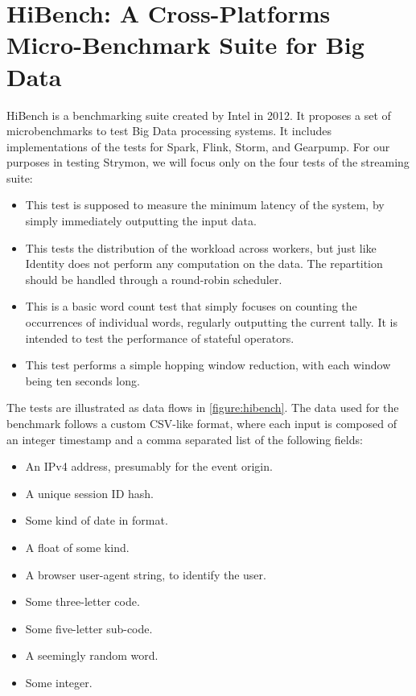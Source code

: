 \section{HiBench: A Cross-Platforms Micro-Benchmark Suite for Big Data\cite{hibench}}
HiBench is a benchmarking suite created by Intel in 2012. It proposes a set of microbenchmarks to test Big Data processing systems. It includes implementations of the tests for Spark, Flink, Storm, and Gearpump. For our purposes in testing Strymon, we will focus only on the four tests of the streaming suite:

\begin{itemize}
\item {} This test is supposed to measure the minimum latency of the system, by simply immediately outputting the input data.
\item {} This tests the distribution of the workload across workers, but just like Identity does not perform any computation on the data. The repartition should be handled through a round-robin scheduler.
\item {} This is a basic word count test that simply focuses on counting the occurrences of individual words, regularly outputting the current tally. It is intended to test the performance of stateful operators.
\item {} This test performs a simple hopping window reduction, with each window being ten seconds long.
\end{itemize}

The tests are illustrated as data flows in \autoref{figure:hibench}. The data used for the benchmark follows a custom CSV-like format, where each input is composed of an integer timestamp and a comma separated list of the following fields:

\begin{itemize}
\item {} An IPv4 address, presumably for the event origin.
\item {} A unique session ID hash.
\item {} Some kind of date in  format.
\item {} A float of some kind.
\item {} A browser user-agent string, to identify the user.
\item {} Some three-letter code.
\item {} Some five-letter sub-code.
\item {} A seemingly random word.
\item {} Some integer.
\end{itemize}


